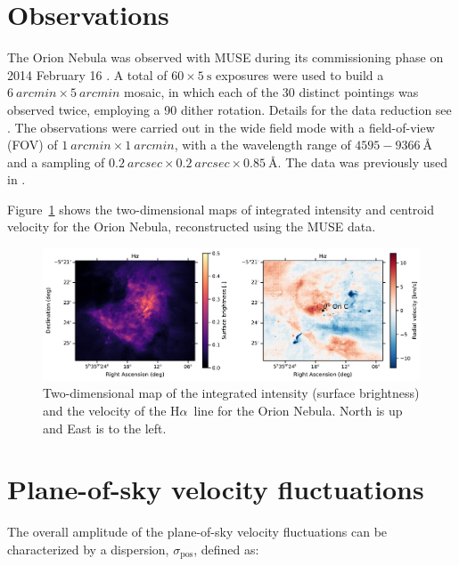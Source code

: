 \documentclass[fleqn,usenatbib, useAMS, a4paper]{mnras}
\newcommand\pos{\ensuremath{_{\mathrm{pos}}}}
\newcommand\halpha{H${\alpha}$}
\begin{document}
\section{Observations}\label{sec:observations}

The Orion Nebula was observed with MUSE during its commissioning phase on 2014 February 16 \citep{2014Msngr.157...13B}.
A total of \(  60 \times 5 \ \text{s}\) exposures were used to build a \(\SI{6}{arcmin} \times \SI{5}{arcmin}\) mosaic, in which each of the 30 distinct pointings was observed twice, employing a 90\textdegree{} dither rotation.
Details for the data reduction see \citep{2015A&A...582A.114W}.
The observations were carried out in the wide field mode with a field-of-view (FOV) of \(\SI{1}{arcmin} \times \SI{1}{arcmin}\), with a the wavelength range of \(4595-  \SI{9366}{\angstrom} \) and a sampling of \(\SI{0.2}{arcsec} \times \SI{0.2}{arcsec} \times \SI{0.85}{\angstrom}  \). 
The data was previously used in \citet{2016MNRAS.455.4057M}.

Figure~\ref{fig:H_I-6563_maps} shows the two-dimensional maps of integrated intensity and centroid velocity for the Orion Nebula, reconstructed using the MUSE data.



\begin{figure}
 \centering
 \includegraphics[width=6.5in]{figures/H_I-6563_maps}\par
 \caption{
 Two-dimensional map of the integrated intensity (surface brightness) and the  velocity of the \halpha\ line for the Orion Nebula. 
 North is up and East is to the left.
 }
\label{fig:H_I-6563_maps}
\end{figure}

\section{Plane-of-sky velocity fluctuations}\label{sec:met}

The overall amplitude of the plane-of-sky velocity fluctuations can be characterized by a dispersion, \(\sigma\pos\), defined as:
\end{document}
